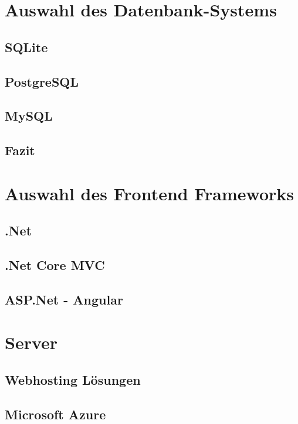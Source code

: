 
\section{Auswahl des Datenbank-Systems}
        
    \subsection{SQLite}
        
        \newpage
    \subsection{PostgreSQL}
        
    \subsection{MySQL}
        
        \newpage
    \subsection{Fazit}
    \lipsum[5-8]
\section{Auswahl des Frontend Frameworks}
    \lipsum[5-12]
    \subsection{.Net}
        \lipsum[5-12]
    \subsection{.Net Core MVC}
        \lipsum[5-12]
    \subsection{ASP.Net - Angular}
        \lipsum[5-12]
\section{Server}
    \lipsum[5-12]
    \subsection{Webhosting Lösungen}
        \lipsum[5-12]
    \subsection{Microsoft Azure}
        \lipsum[5-12]

